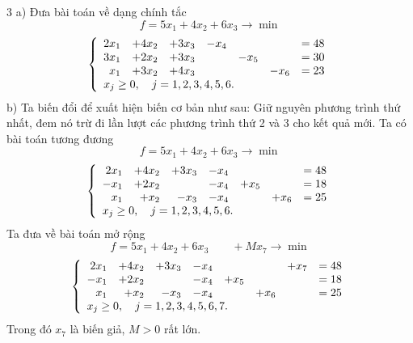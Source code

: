 \begin{Soln}{3}
a) Đưa bài toán về dạng chính tắc
$$ f=5x_1+4x_2+6x_3\rightarrow \min$$
\begin{equation*}
\left\{
\begin{array}{r r r r r  r l }
2x_1&+4x_2&+3x_3&-x_4&&&= 48 \\
3x_1&+2x_2&+3x_3&&-x_5&&= 30 \\
x_1&+3x_2&+4x_3&&&-x_6&= 23 \\
\multicolumn{6}{l}{x_j\ge 0,\quad j = 1, 2, 3, 4, 5, 6.}\\
\end{array}
\right.
\end{equation*}
b) Ta biến đổi để xuất hiện biến cơ bản như sau:  Giữ nguyên phương trình thứ nhất, đem nó trừ đi lần lượt các phương trình thứ 2 và 3 cho kết quả mới. Ta có bài toán tương đương
$$ f=5x_1+4x_2+6x_3\rightarrow \min$$
\begin{equation*}
\left\{
\begin{array}{r r r r r  r l }
2x_1&+4x_2&+3x_3&-x_4&&&= 48 \\
-x_1&+2x_2&&-x_4&+x_5&&= 18 \\
x_1&+x_2&-x_3&-x_4&&+x_6&= 25 \\
\multicolumn{6}{l}{x_j\ge 0,\quad j = 1, 2, 3, 4, 5, 6.}\\
\end{array}
\right.
\end{equation*}
Ta đưa về bài toán mở rộng
$$ f=5x_1+4x_2+6x_3\qquad +Mx_7\rightarrow \min$$
\begin{equation*}
\left\{
\begin{array}{r r r r r  r r l }
2x_1&+4x_2&+3x_3&-x_4&&&+x_7&= 48 \\
-x_1&+2x_2&&-x_4&+x_5&&&= 18 \\
x_1&+x_2&-x_3&-x_4&&+x_6&&= 25 \\
\multicolumn{6}{l}{x_j\ge 0,\quad j = 1, 2, 3, 4, 5, 6,7.}\\
\end{array}
\right.
\end{equation*}
Trong đó $x_7$ là biến giả, $M>0$ rất lớn.


\end{Soln}
